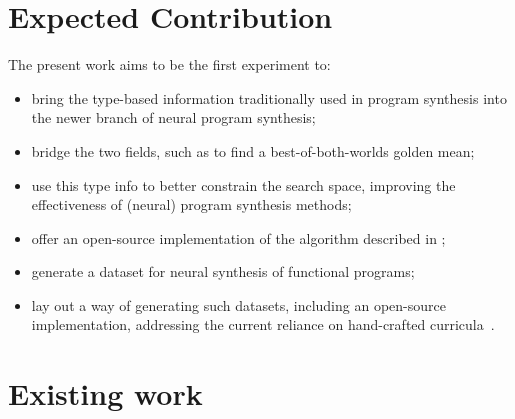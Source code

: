 \documentclass{article}
\begin{document}
\section{Expected Contribution} %

The present work aims to be the first experiment to:
\begin{itemize}
    \item bring the type-based information traditionally used in program synthesis into the newer branch of neural program synthesis;
    \item bridge the two fields, such as to find a best-of-both-worlds golden mean;
    \item use this type info to better constrain the search space, improving the effectiveness of (neural) program synthesis methods;
    \item offer an open-source implementation of the algorithm described in \citet{nsps};
    \item generate a dataset for neural synthesis of functional programs;
    \item lay out a way of generating such datasets, including an open-source implementation, addressing the current reliance on hand-crafted curricula~\citep{nps}.
\end{itemize}

\section{Existing work} %
\end{document}
